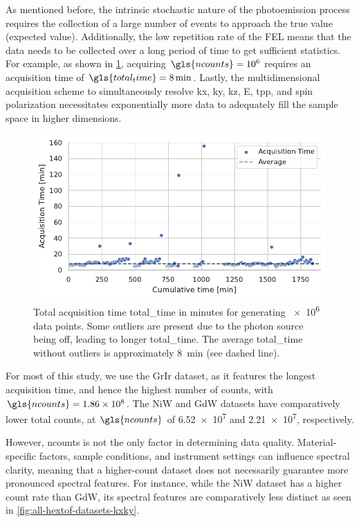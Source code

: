 As mentioned before, the intrinsic stochastic nature of the photoemission process requires the collection of a large number of events to approach the true value (expected value). Additionally, the low repetition rate of the \gls{FEL} means that the data  needs to be collected over a long period of time to get sufficient statistics. For example, as shown in \cref{fig:acq-time-1M}, acquiring $\gls{ncounts}=\num{e6}$  requires an acquisition time of $\gls{total_time}=\qty{8}{\min}$. Lastly, the multidimensional acquisition scheme to simultaneously resolve \gls{kx}, \gls{ky}, \gls{kz}, \gls{E}, \gls{tpp}, and spin polarization necessitates exponentially  more data to adequately fill the sample space in higher dimensions.

\begin{figure}[h]
    \centering
    \includegraphics[width=0.8\linewidth]{images/acq_time_1M.pdf}
    \caption{Total acquisition time \gls{total_time} in minutes for generating \num{e6} data points. Some outliers are present due to the photon source being off, leading to longer \gls{total_time}. The average \gls{total_time} without outliers is approximately \qty{8}{min} (see dashed line).}
    \label{fig:acq-time-1M}
\end{figure}

For most of this study, we use the \gls{GrIr} dataset, as it features the longest acquisition time, and hence the highest number of counts, with $\gls{ncounts}=\num{1.86e8}$. The \gls{NiW} and \gls{GdW} datasets have comparatively lower total counts, at $\gls{ncounts}$ of \num{6.52e7} and \num{2.21e7}, respectively. 

However, \gls{ncounts} is not the only factor in determining data quality. Material-specific factors, sample conditions, and instrument settings can influence spectral clarity, meaning that a higher-count dataset does not necessarily guarantee more pronounced spectral features. For instance, while the \gls{NiW} dataset has a higher count rate  than \gls{GdW}, its spectral features are comparatively less distinct as seen in \cref{fig:all-hextof-datasets-kxky}.

